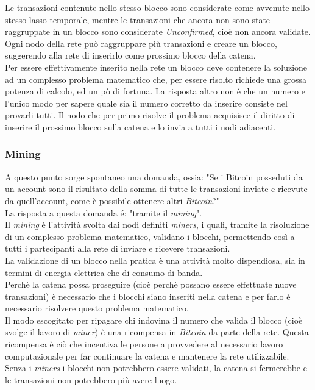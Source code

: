 \documentclass[11pt]{thesistemp}
\begin{document}
Le transazioni contenute nello stesso blocco sono considerate come avvenute nello stesso lasso temporale, mentre le transazioni che ancora non sono state raggruppate in un blocco sono considerate \textit{Unconfirmed}, cioè non ancora validate.\\ 
Ogni nodo della rete può raggruppare più transazioni e creare un blocco, suggerendo alla rete di inserirlo come prossimo blocco della catena. \\
Per essere effettivamente inserito nella rete un blocco deve contenere la soluzione ad un complesso problema matematico che, per essere risolto richiede una grossa potenza di calcolo, ed un pò di fortuna.
La risposta altro non è che un numero e l'unico modo per sapere quale sia il numero corretto da inserire consiste nel provarli tutti.
Il nodo che per primo risolve il problema acquisisce il diritto di inserire il prossimo blocco sulla catena e lo invia a tutti i nodi adiacenti.

\subsubsection{Mining}
A questo punto sorge spontaneo una domanda, ossia: "Se i Bitcoin posseduti da un account sono il risultato della somma di tutte le transazioni inviate e ricevute da quell'account, come è possibile ottenere altri \textit{Bitcoin}?"\\
La risposta a questa domanda é: "tramite il \textit{mining}".\\
Il \textit{mining} è l'attività svolta dai nodi definiti \textit{miners}, i quali, tramite la risoluzione di un complesso problema matematico, validano i blocchi, permettendo così a tutti i partecipanti alla rete di inviare e ricevere transazioni.\\
La validazione di un blocco nella pratica è una attività molto dispendiosa, sia in termini di energia elettrica che di consumo di banda.\\
Perchè la catena possa proseguire (cioè perchè possano essere effettuate nuove transazioni) è necessario che i blocchi siano inseriti nella catena e per farlo è necessario risolvere questo problema matematico.\\
Il modo escogitato per ripagare chi indovina il numero che valida il blocco (cioè svolge il lavoro di \textit{miner}) è una ricompensa in \textit{Bitcoin} da parte della rete. 
Questa ricompensa è ciò che incentiva le persone a provvedere al necessario lavoro computazionale per far continuare la catena e mantenere la rete utilizzabile. Senza i \textit{miners} i blocchi non potrebbero essere validati, la catena si fermerebbe e le transazioni non potrebbero più avere luogo.
\end{document}
